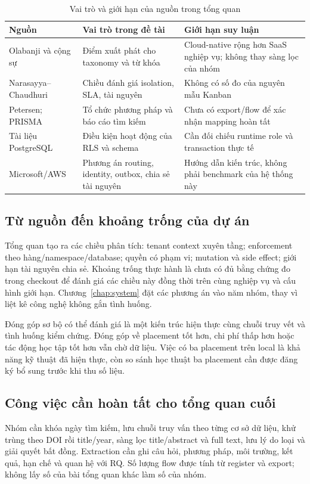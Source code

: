 \begin{table}[htbp]
\centering\caption{Vai trò và giới hạn của nguồn trong tổng quan}\label{tab:literature}
\begin{tabularx}{\textwidth}{P{.23\textwidth}XX}
\toprule Nguồn & Vai trò trong đề tài & Giới hạn suy luận \\
\midrule
Olabanji và cộng sự & Điểm xuất phát cho taxonomy và từ khóa & Cloud-native rộng hơn SaaS nghiệp vụ; không thay sàng lọc của nhóm \\
Narasayya--Chaudhuri & Chiều đánh giá isolation, SLA, tài nguyên & Không có số đo của nguyên mẫu Kanban \\
Petersen; PRISMA & Tổ chức phương pháp và báo cáo tìm kiếm & Chưa có export\slash flow để xác nhận mapping hoàn tất \\
Tài liệu PostgreSQL & Điều kiện hoạt động của RLS và schema & Cần đối chiếu runtime role và transaction thực tế \\
Microsoft\slash AWS & Phương án routing, identity, outbox, chia sẻ tài nguyên & Hướng dẫn kiến trúc, không phải benchmark của hệ thống này \\
\bottomrule\end{tabularx}
\end{table}

\subsection{Từ nguồn đến khoảng trống của dự án}
Tổng quan tạo ra các chiều phân tích: tenant context xuyên tầng; enforcement theo hàng\slash namespace\slash database; quyền có phạm vi; mutation và side effect; giới hạn tài nguyên chia sẻ. Khoảng trống thực hành là chưa có đủ bằng chứng đo trong checkout để đánh giá các chiều này đồng thời trên cùng nghiệp vụ và cấu hình giới hạn. Chương~\ref{chap:system} đặt các phương án vào năm nhóm, thay vì liệt kê công nghệ không gắn tình huống.

Đóng góp sơ bộ có thể đánh giá là một kiến trúc hiện thực cùng chuỗi truy vết và tình huống kiểm chứng. Đóng góp về placement tốt hơn, chi phí thấp hơn hoặc tác động học tập tốt hơn vẫn chờ dữ liệu. Việc có ba placement trên local là khả năng kỹ thuật đã hiện thực, còn so sánh học thuật ba placement cần được đăng ký bổ sung trước khi thu số liệu.

\subsection{Công việc cần hoàn tất cho tổng quan cuối}
Nhóm cần khóa ngày tìm kiếm, lưu chuỗi truy vấn theo từng cơ sở dữ liệu, khử trùng theo DOI rồi title\slash year, sàng lọc title\slash abstract và full text, lưu lý do loại và giải quyết bất đồng. Extraction cần ghi câu hỏi, phương pháp, môi trường, kết quả, hạn chế và quan hệ với RQ. Số lượng flow được tính từ register và export; không lấy số của bài tổng quan khác làm số của nhóm.
